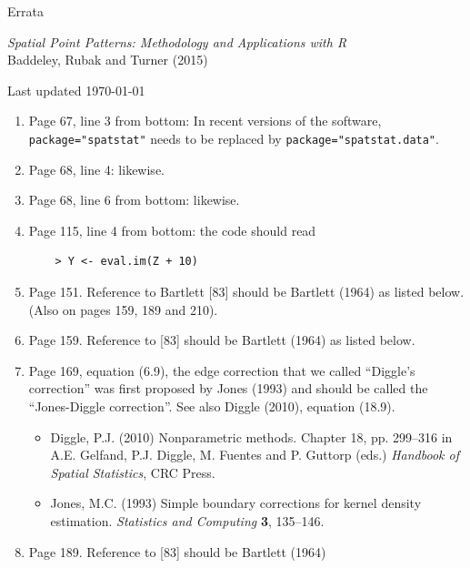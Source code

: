 \documentclass[12pt,a4paper]{article}
\begin{document}
\thispagestyle{empty}
\begin{center}
  \begin{LARGE}
    Errata 
  \end{LARGE}

  \begin{large}
    \emph{Spatial Point Patterns: Methodology and Applications with R}\\
    Baddeley, Rubak and Turner (2015)\\ 
  \end{large}
  Last updated \today
\end{center}

\begin{enumerate}
\item Page 67, line 3 from bottom: In recent versions of the software,
  \texttt{package="spatstat"} needs to be replaced by
  \texttt{package="spatstat.data"}.
\item Page 68, line 4: likewise.
\item Page 68, line 6 from bottom: likewise.
\item Page 115, line 4 from bottom: the code should read
\begin{verbatim}
    > Y <- eval.im(Z + 10)
\end{verbatim}
\item Page 151. Reference to Bartlett [83] should be Bartlett (1964)
  as listed below. (Also on pages 159, 189 and 210).
\item Page 159. Reference to [83] should be Bartlett (1964)
  as listed below.
\item Page 169, equation (6.9), the edge correction that we called
  ``Diggle's correction'' was first proposed by Jones (1993)
  and should be called the ``Jones-Diggle correction''.
  See also Diggle (2010), equation (18.9).
\begin{small}
  \begin{itemize}
  \item
    Diggle, P.J. (2010)
    Nonparametric methods.
    Chapter 18, pp. 299--316 in
    A.E. Gelfand, P.J. Diggle, M. Fuentes and P. Guttorp (eds.)
    \emph{Handbook of Spatial Statistics}, CRC Press.
  \item  Jones, M.C. (1993)
    Simple boundary corrections for kernel density estimation.
    \emph{Statistics and Computing} \textbf{3}, 135--146.
  \end{itemize}
\end{small}
\item Page 189. Reference to [83] should be Bartlett (1964)

\end{enumerate}
\end{document}
